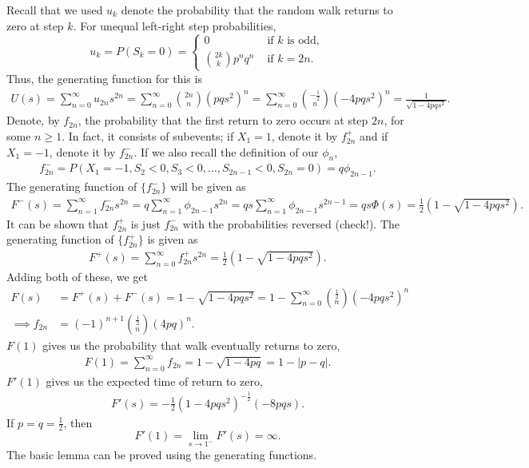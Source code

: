 \documentclass[15pt,a4paper]{book}
\theoremstyle{definition}
\newcommand{\abs}[1]{\left| #1 \right|} %
\begin{document}
Recall that we used $u_{k}$ denote the probability that the random walk returns to zero at step $k$. For unequal left-right step probabilities,
\begin{equation*}
    u_{k} = P(S_{k}=0) = \begin{cases}
        0 &\text{ if $k$ is odd},\\
        \binom{2k}{k} p^{n} q^{n} &\text{ if } k = 2n.
    \end{cases}
\end{equation*}
Thus, the generating function for this is
\begin{align}
    U(s) = \sum_{n=0}^{\infty} u_{2n}s^{2n} = \sum_{n=0}^{\infty} \binom{2n}{n} (pqs^{2})^{n} = \sum_{n=0}^{\infty} \binom{-\frac{1}{2}}{n} (-4pqs^{2})^{n} = \frac{1}{\sqrt{1-4pqs^{2}}}.
\end{align}
Denote, by $f_{2n}$, the probability that the first return to zero occurs at step $2n$, for some $n \geq 1$. In fact, it consists of subevents; if $X_{1} = 1$, denote it by $f_{2n}^{+}$ and if $X_{1} = -1$, denote it by $f_{2n}^{-}$. If we also recall the definition of our $\phi_{n}$,
\begin{align}
    f_{2n}^{-} = P(X_{1}=-1,S_{2}<0,S_{3}<0,\ldots,S_{2n-1}<0,S_{2n}=0) = q \phi_{2n-1}.
\end{align}
The generating function of $\{f_{2n}^{-}\}$ will be given as
\begin{align}
    F^{-}(s) = \sum_{n=1}^{\infty} f_{2n}^{-} s^{2n} = q\sum_{n=1}^{\infty} \phi_{2n-1}s^{2n} = qs \sum_{n=1}^{\infty} \phi_{2n-1} s^{2n-1} = qs \Phi(s) = \frac{1}{2}(1-\sqrt{1-4pqs^{2}}).
\end{align}
It can be shown that $f_{2n}^{+}$ is just $f_{2n}^{-}$ with the probabilities reversed (check!). The generating function of $\{f_{2n}^{+}\}$ is given as
\begin{align}
    F^{+}(s) = \sum_{n=0}^{\infty} f_{2n}^{+}s^{2n} = \frac{1}{2}(1-\sqrt{1-4pqs^{2}}).
\end{align}
Adding both of these, we get
\begin{align}
    F(s) &= F^{+}(s) + F^{-}(s) = 1-\sqrt{1-4pqs^{2}} = 1 - \sum_{n=0}^{\infty} \binom{\frac{1}{2}}{n} (-4pqs^{2})^{n}\\
    \implies f_{2n} &= (-1)^{n+1} \binom{\frac{1}{2}}{n} (4pq)^{n}.
\end{align}
$F(1)$ gives us the probability that walk eventually returns to zero,
\begin{align}
    F(1) = \sum_{n=0}^{\infty} f_{2n} = 1-\sqrt{1-4pq} = 1-\abs{p-q}.
\end{align}
$F'(1)$ gives us the expected time of return to zero,
\begin{align}
    F'(s) = -\frac{1}{2}(1-4pqs^{2})^{-\frac{1}{2}}(-8pqs).
\end{align}
If $p = q = \frac{1}{2}$, then
\begin{equation*}
    F'(1) = \lim_{s \to 1^{-}} F'(s) = \infty.
\end{equation*}
The basic lemma can be proved using the generating functions.
\end{document}
